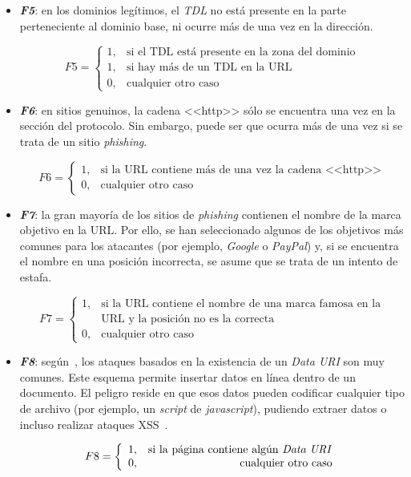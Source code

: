 \begin{itemize}
	\item \textit{\textbf{F5}}: en los dominios legítimos, el \textit{TDL} no está presente en la parte perteneciente al dominio base, ni ocurre más de una vez en la dirección.
	
	\[F5 = \left\{ \begin{array}{lr} 1, & \text{si el TDL está presente en la zona del dominio}\\ 
	1, & \text{si hay más de un TDL en la URL} \\
	0, & \text{cualquier otro caso} \label{eqn:phishing_f5} \end{array} \right. \]
	
	
	\item \textit{\textbf{F6}}: en sitios genuinos, la cadena <<http>> sólo se encuentra una vez en la sección del protocolo. Sin embargo, puede ser que ocurra más de una vez si se trata de un sitio \textit{phishing}.
	
	\[F6 = \left\{ \begin{array}{lr} 1, & \text{si la URL contiene más de una vez la cadena <<http>>}\\ 
	0, & \text{cualquier otro caso} \label{eqn:phishing_f6} \end{array} \right. \]

	\item \textit{\textbf{F7}}: la gran mayoría de los sitios de \textit{phishing} contienen el nombre de la marca objetivo en la URL. Por ello, se han seleccionado algunos de los objetivos más comunes para los atacantes (por ejemplo, \textit{Google} o \textit{PayPal}) y, si se encuentra el nombre en una posición incorrecta, se asume que se trata de un intento de estafa.
	
	\[F7 = \left\{ \begin{array}{lr} 1, & \text{si la URL contiene el nombre de una marca famosa en la}\\ & \text{URL y la posición no es la correcta}\\ 
	0, & \text{cualquier otro caso} \label{eqn:phishing_f7} \end{array} \right. \]
	
	\item \textit{\textbf{F8}}: según~\cite{featuresPhishing2018Gupta}, los ataques basados en la existencia de un \textit{Data URI} son muy comunes. Este esquema permite insertar datos en línea dentro de un documento. El peligro reside en que esos datos pueden codificar cualquier tipo de archivo (por ejemplo, un \textit{script} de \textit{javascript}), pudiendo extraer datos o incluso realizar ataques XSS~\cite{dataUri2020neoguias}. 
	
	\[F8 = \left\{ \begin{array}{lr} 1, & \text{si la página contiene algún \textit{Data URI}}\\ 
	0, & \text{\raggedright cualquier otro caso} \label{eqn:phishing_f8} \end{array} \right. \]
	\end{itemize}

